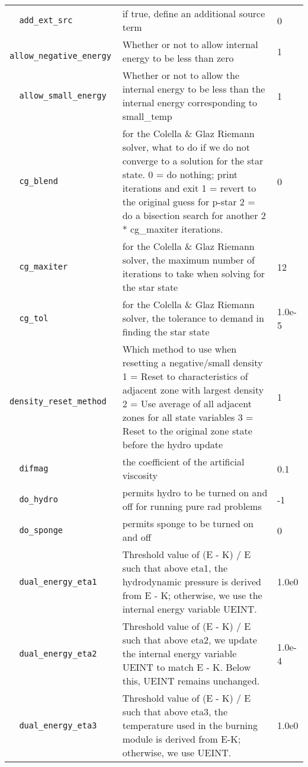 \begin{landscape}
{\begin{center}
\begin{longtable}{|l|p{5.25in}|l|}
\rowcolor{tableShade}
\verb=  add_ext_src  = &   if true, define an additional source term  &  0 \\
\verb=  allow_negative_energy  = &   Whether or not to allow internal energy to be less than zero  &  1 \\
\rowcolor{tableShade}
\verb=  allow_small_energy  = &   Whether or not to allow the internal energy to be less than the internal energy corresponding to small\_temp  &  1 \\
\verb=  cg_blend  = &   for the Colella \& Glaz Riemann solver, what to do if we do not converge to a solution for the star state. 0 = do nothing; print iterations and exit 1 = revert to the original guess for p-star 2 = do a bisection search for another 2 * cg\_maxiter iterations.  &  0 \\
\rowcolor{tableShade}
\verb=  cg_maxiter  = &   for the Colella \& Glaz Riemann solver, the maximum number of iterations to take when solving for the star state  &  12 \\
\verb=  cg_tol  = &   for the Colella \& Glaz Riemann solver, the tolerance to demand in finding the star state  &  1.0e-5 \\
\rowcolor{tableShade}
\verb=  density_reset_method  = &   Which method to use when resetting a negative/small density 1 = Reset to characteristics of adjacent zone with largest density 2 = Use average of all adjacent zones for all state variables 3 = Reset to the original zone state before the hydro update  &  1 \\
\verb=  difmag  = &   the coefficient of the artificial viscosity  &  0.1 \\
\rowcolor{tableShade}
\verb=  do_hydro  = &   permits hydro to be turned on and off for running pure rad problems  &  -1 \\
\verb=  do_sponge  = &   permits sponge to be turned on and off  &  0 \\
\rowcolor{tableShade}
\verb=  dual_energy_eta1  = &   Threshold value of (E - K) / E such that above eta1, the hydrodynamic pressure is derived from E - K; otherwise, we use the internal energy variable UEINT.  &  1.0e0 \\
\verb=  dual_energy_eta2  = &   Threshold value of (E - K) / E such that above eta2, we update the internal energy variable UEINT to match E - K. Below this, UEINT remains unchanged.  &  1.0e-4 \\
\rowcolor{tableShade}
\verb=  dual_energy_eta3  = &   Threshold value of (E - K) / E such that above eta3, the temperature used in the burning module is derived from E-K; otherwise, we use UEINT.  &  1.0e0 \\

\end{longtable}
\end{center}}
\end{landscape}
